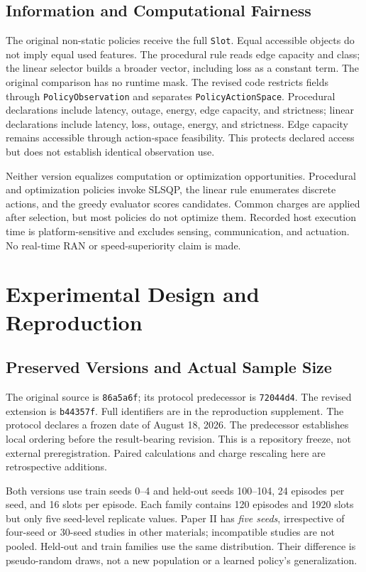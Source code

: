\documentclass[letterpaper,journal]{IEEEtran}
\newcommand{\pol}[1]{\texttt{#1}}
\begin{document}
\subsection{Information and Computational Fairness}
The original non-static policies receive the full \pol{Slot}. Equal accessible objects do not imply equal used features. The procedural rule reads edge capacity and class; the linear selector builds a broader vector, including loss as a constant term. The original comparison has no runtime mask. The revised code restricts fields through \pol{PolicyObservation} and separates \pol{PolicyActionSpace}. Procedural declarations include latency, outage, energy, edge capacity, and strictness; linear declarations include latency, loss, outage, energy, and strictness. Edge capacity remains accessible through action-space feasibility. This protects declared access but does not establish identical observation use.

Neither version equalizes computation or optimization opportunities. Procedural and optimization policies invoke SLSQP, the linear rule enumerates discrete actions, and the greedy evaluator scores candidates. Common charges are applied after selection, but most policies do not optimize them. Recorded host execution time is platform-sensitive and excludes sensing, communication, and actuation. No real-time RAN or speed-superiority claim is made.

\section{Experimental Design and Reproduction}
\subsection{Preserved Versions and Actual Sample Size}
The original source is \texttt{86a5a6f}; its protocol predecessor is \texttt{72044d4}. The revised extension is \texttt{b44357f}. Full identifiers are in the reproduction supplement. The protocol declares a frozen date of August 18, 2026. The predecessor establishes local ordering before the result-bearing revision. This is a repository freeze, not external preregistration. Paired calculations and charge rescaling here are retrospective additions.

Both versions use train seeds 0--4 and held-out seeds 100--104, 24 episodes per seed, and 16 slots per episode. Each family contains 120 episodes and 1920 slots but only five seed-level replicate values. Paper II has \emph{five seeds}, irrespective of four-seed or 30-seed studies in other materials; incompatible studies are not pooled. Held-out and train families use the same distribution. Their difference is pseudo-random draws, not a new population or a learned policy's generalization.
\end{document}

